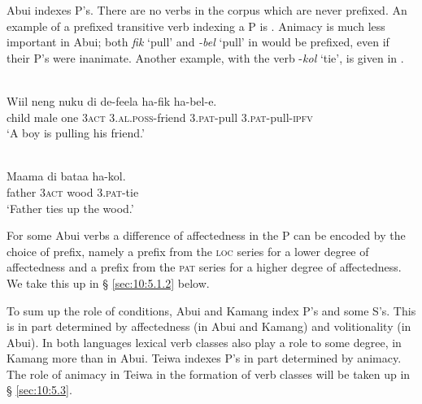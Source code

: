 Abui indexes P's. There are no verbs in the corpus which are never prefixed. An example of a prefixed transitive verb indexing a P is . Animacy is much less important in Abui; both \textit{fik} `pull' and \textit{{}-bel} `pull' in  would be prefixed, even if their P's were inanimate. Another example, with the verb -\textit{kol} `tie', is given in .


\ea%
\label{bkm:Ref306280933}
 \\ 
\gll    Wiil  neng  nuku  di  de-feela  ha-fik    ha-bel-e.      \\  
     child  male  one  3\textsc{act} 3.\textsc{al.poss}{}-friend  3.\textsc{pat}{}-pull  3\textsc{.pat}{}-pull-\textsc{ipfv}  \\
\glt  `A boy is pulling his friend.'  
\z









   


\ea%
\label{bkm:Ref383697305}
 \\ 
\gll   Maama  di  bataa  ha-kol. \\  
     father  3\textsc{act} wood  3.\textsc{pat}{}-tie \\
\glt  `Father ties up the wood.'
\z







For some Abui verbs a difference of affectedness in the P can be encoded by the choice of prefix, namely a prefix from the \textsc{loc} series for a lower degree of affectedness and a prefix from the \textsc{pat} series for a higher degree of affectedness. We take this up in {\S} \ref{sec:10:5.1.2} below.

To sum up the role of conditions, Abui and Kamang index P's and some S's. This is in part determined by affectedness (in Abui and Kamang) and volitionality (in Abui). In both languages lexical verb classes also play a role to some degree, in Kamang more than in Abui. Teiwa indexes P's in part determined by animacy. The role of animacy in Teiwa in the formation of verb classes will be taken up in {\S} \ref{sec:10:5.3}.

